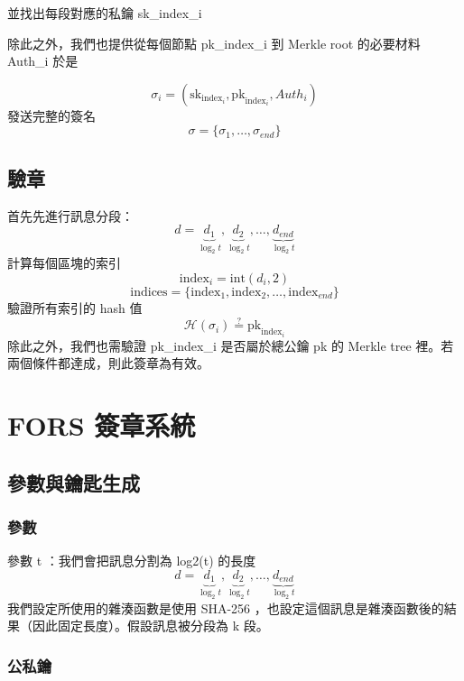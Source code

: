 \documentclass[
]{article}
\begin{document}
並找出每段對應的私鑰 sk\_index\_i

除此之外，我們也提供從每個節點 pk\_index\_i 到 Merkle root 的必要材料
Auth\_i 於是

\[
\sigma_{i} = (\mathrm{sk}_{\mathrm{index}_{i}} ,\mathrm{pk}_{\mathrm{index}_{i}}, Auth_{i})
\] 發送完整的簽名 \[
\sigma 
= \{\sigma_{1},\dots,\sigma_{end}\}
\]

\hypertarget{ux9a57ux7ae0}{%
\subsection{驗章}\label{ux9a57ux7ae0}}

首先先進行訊息分段： \[
d = \underbrace{ d_{1} }_{ \log_{2}t },\underbrace{ d_{2} }_{ \log_{2}t},\dots,\underbrace{ d_{end} }_{ \log_{2}t}
\] 計算每個區塊的索引 \[
\mathrm{index}_{i} = \mathrm{int}(d_{i},2)
\] \[
\mathrm{indices} = \{ \mathrm{index}_{1},\mathrm{index}_{2},\dots, \mathrm{index}_{end}\}
\] 驗證所有索引的 hash 值 \[
\mathcal{H}(\sigma_{i}) 
\overset{?}{=} \mathrm{pk}_{\mathrm{index}_{i}} 
\] 除此之外，我們也需驗證 pk\_index\_i 是否屬於總公鑰 pk 的 Merkle tree
裡。若兩個條件都達成，則此簽章為有效。

\hypertarget{fors-ux7c3dux7ae0ux7cfbux7d71}{%
\section{FORS 簽章系統}\label{fors-ux7c3dux7ae0ux7cfbux7d71}}

\hypertarget{ux53c3ux6578ux8207ux9470ux5319ux751fux6210-1}{%
\subsection{參數與鑰匙生成}\label{ux53c3ux6578ux8207ux9470ux5319ux751fux6210-1}}

\hypertarget{ux53c3ux6578-1}{%
\subsubsection{參數}\label{ux53c3ux6578-1}}

參數 t ：我們會把訊息分割為 log2(t) 的長度 \[
d = \underbrace{ d_{1} }_{ \log_{2}t },\underbrace{ d_{2} }_{ \log_{2}t},\dots,\underbrace{ d_{end} }_{ \log_{2}t}
\] 我們設定所使用的雜湊函數是使用 SHA-256
，也設定這個訊息是雜湊函數後的結果（因此固定長度）。假設訊息被分段為 k
段。

\hypertarget{ux516cux79c1ux9470-1}{%
\subsubsection{公私鑰}\label{ux516cux79c1ux9470-1}}
\end{document}
